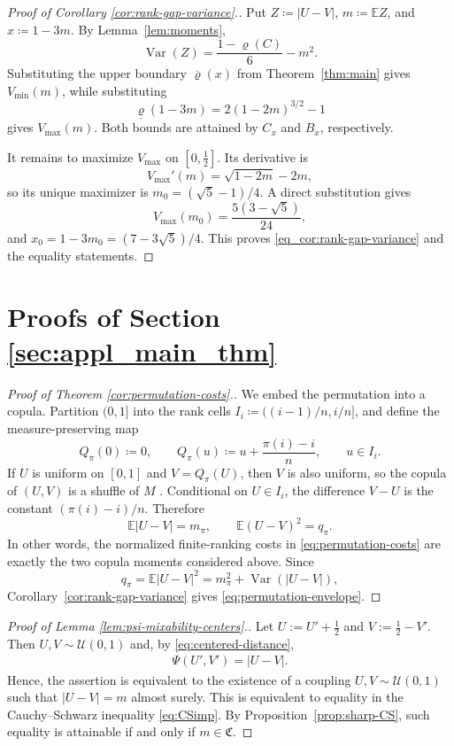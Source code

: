 \documentclass{article}
\newcommand{\brho}{\overline\varrho}
\newcommand{\Var}{\operatorname{Var}}
\newcommand{\E}{\mathbb{E}}
\newcommand{\cU}{\mathcal{U}}
\begin{document}
\begin{proof}[Proof of Corollary \ref{cor:rank-gap-variance}.]
Put \(Z\coloneqq|U-V|\), \(m\coloneqq\E Z\), and \(x\coloneqq1-3m\).
By Lemma~\ref{lem:moments},
\[
    \Var(Z)=\frac{1-\varrho(C)}{6}-m^2.
\]
Substituting the upper boundary \(\brho(x)\) from Theorem~\ref{thm:main} gives \(V_{\operatorname{min}}(m)\), while substituting
\[
    \underline{\varrho}(1-3m)
    =
    2(1-2m)^{3/2}-1
\]
gives \(V_{\operatorname{max}}(m)\).
Both bounds are attained by \(C_x\) and \(B_x\), respectively.

It remains to maximize \(V_{\operatorname{max}}\) on \([0,\tfrac12]\).
Its derivative is
\[
    V_{\operatorname{max}}'(m)
    =
    \sqrt{1-2m}-2m,
\]
so its unique maximizer is \(m_0=(\sqrt5-1)/4\).
A direct substitution gives
\[
    V_{\operatorname{max}}(m_0)
    =
    \frac{5(3-\sqrt5)}{24},
\]
and \(x_0=1-3m_0=(7-3\sqrt5)/4\).
This proves \eqref{eq_cor:rank-gap-variance} and the equality statements.
\end{proof}


\section{Proofs of Section \ref{sec:appl_main_thm}}\label{sec:proof2}



\begin{proof}[Proof of Theorem \ref{cor:permutation-costs}.]
	We embed the permutation into a copula.
	Partition \((0,1]\) into the rank cells \(I_i\coloneqq((i-1)/n,i/n]\), and define the measure-preserving map
	\[
		Q_\pi(0)\coloneqq0,
		\qquad
		Q_\pi(u)\coloneqq u+\frac{\pi(i)-i}{n},
		\qquad u\in I_i.
	\]
	If \(U\) is uniform on \([0,1]\) and \(V=Q_\pi(U)\), then \(V\) is also uniform, so the copula of \((U,V)\) is a shuffle of \(M\) \cite{mikusinski1992shuffles}.
	Conditional on \(U\in I_i\), the difference \(V-U\) is the constant \((\pi(i)-i)/n\).
	Therefore
	\[
		\E|U-V|=m_\pi,
		\qquad
		\E(U-V)^2=q_\pi.
	\]
	In other words, the normalized finite-ranking costs in \eqref{eq:permutation-costs} are exactly the two copula moments considered above.
	Since
	\[
		q_\pi
		=\E|U-V|^2
		=m_\pi^2+\Var(|U-V|),
	\]
	Corollary~\ref{cor:rank-gap-variance} gives \eqref{eq:permutation-envelope}.
\end{proof}


\begin{proof}[Proof of Lemma \ref{lem:psi-mixability-centers}.]
Let \(U:=U'+\tfrac12\) and \(V:=\tfrac12-V'\).
Then \(U,V\sim\cU(0,1)\) and, by \eqref{eq:centered-distance},
\begin{align*}
    \Psi(U',V')
    =
    |U-V|.
\end{align*}
Hence, the assertion is equivalent to the existence of a coupling \(U,V\sim\cU(0,1)\) such that \(|U-V|=m\) almost surely.
This is equivalent to equality in the Cauchy--Schwarz inequality \eqref{eq:CSimp}.
By Proposition~\ref{prop:sharp-CS}, such equality is attainable if and only if \(m\in\mathfrak C\).
\end{proof}
\end{document}

